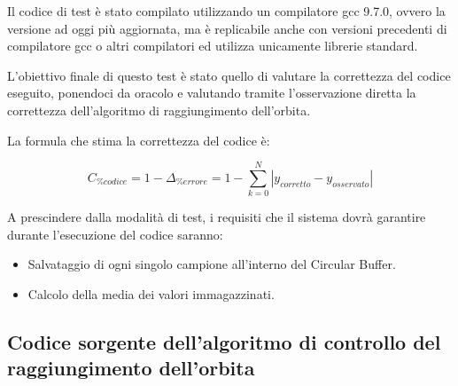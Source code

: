 \documentclass[LaM,binding=0.6cm]{../sapthesis}
\begin{document}
Il codice di test è stato compilato utilizzando un compilatore gcc 9.7.0, ovvero la versione ad oggi più aggiornata, ma è replicabile anche con versioni precedenti di compilatore gcc o altri compilatori ed utilizza unicamente librerie standard.

L'obiettivo finale di questo test è stato quello di valutare la correttezza del codice eseguito, ponendoci da oracolo e valutando tramite l'osservazione diretta la correttezza dell'algoritmo di raggiungimento dell'orbita.

La formula che stima la correttezza del codice è:

\begin{equation}
     C_{\% codice}  = 1 - \Delta_{\% errore} = 1 - \sum_{k=0}^{N} | y_{corretto} - y_{osservato} |
\end{equation}

A prescindere dalla modalità di test, i requisiti che il sistema dovrà garantire durante l'esecuzione del codice saranno:
\begin{itemize}
    \item Salvataggio di ogni singolo campione all'interno del Circular Buffer.
    
    \item Calcolo della media dei valori immagazzinati.
\end{itemize}


\subsection{Codice sorgente dell'algoritmo di controllo del raggiungimento dell'orbita}
\end{document}
